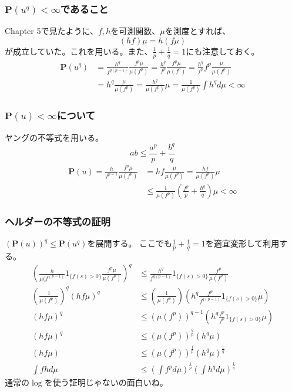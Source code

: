      \subsubsection{$\mathbf{P}(u^q) < \infty$であること}
        Chapter 5で見たように、$f,h$を可測関数、$\mu$を測度とすれば、
        \[
          (hf)\mu = h(f\mu)
        \]
        が成立していた。これを用いる。また、$\frac{1}{p} + \frac{1}{q} = 1$にも注意しておく。
        \begin{align*}
          \mathbf{P}(u^q) &= \frac{h^q}{f^{q(p-1)}}\frac{f^p\mu}{\mu(f^p)}
          = \frac{h^q}{f^p}\frac{f^p\mu}{\mu(f^p)}
          = \frac{h^q}{f^p}f^p \frac{\mu}{\mu(f^p)} \\
          &= h^q \frac{\mu}{\mu(f^p)} = \frac{h^q}{\mu(f^p)}\mu
          =\frac{1}{\mu(f^p)}\int h^q d\mu < \infty
        \end{align*}

      \subsubsection{$\mathbf{P}(u) < \infty$について}
        ヤングの不等式を用いる。
        \[
          ab \leq \frac{a^p}{p} + \frac{b^q}{q}
        \]
        \begin{align*}
          \mathbf{P}(u)
          = \frac{h}{f^{p-1}}\frac{f^p\mu}{\mu(f^p)}
          &= hf\frac{\mu}{\mu(f^p)}
          = \frac{hf}{\mu(f^p)}\mu \\
          &\leq \frac{1}{\mu(f^p)} \left( \frac{f^p}{p} + \frac{h^q}{q} \right) \mu
          < \infty
        \end{align*}

      \subsubsection{ヘルダーの不等式の証明}
        $(\mathbf{P}(u))^q \leq \mathbf{P}(u^q)$を展開する。
        ここでも$\frac{1}{p} + \frac{1}{q} = 1$を適宜変形して利用する。
        \begin{align*}
          \left( \frac{h}{\mu(f^{(p-1)}} 1_{\{f(s) > 0\}} \frac{f^p \mu}{\mu(f^p)} \right)^q
          &\leq
          \frac{h^q}{f^{q(p-1)}}1_{\{f(s) > 0\}}\frac{f^p}{\mu(f^p)} \\
          \left(\frac{1}{\mu(f^p)}\right)^q (hf\mu)^q
          &\leq
          \left(\frac{1}{\mu(f^p)}\right) \left(h^q\frac{f^p}{f^{q(p-1)}}1_{\{f(s) > 0\}}\mu \right)\\
          (hf\mu)^q
          &\leq
          (\mu(f^p))^{q-1} \left(h^q \frac{f^p}{f^p}1_{\{f(s) > 0\}} \mu\right)\\
          (hf\mu)^q
          &\leq
          (\mu(f^p))^{\frac{q}{p}}(h^q \mu) \\
          (hf\mu)
          &\leq
          (\mu(f^p))^{\frac{1}{p}}(h^q\mu)^{\frac{1}{q}} \\
          \int fh d\mu
          &\leq
          \left(\int f^p d\mu \right)^{\frac{1}{p}} \left(\int h^q d\mu \right)^{\frac{1}{q}}
        \end{align*}
        通常の$\log$を使う証明じゃないの面白いね。

